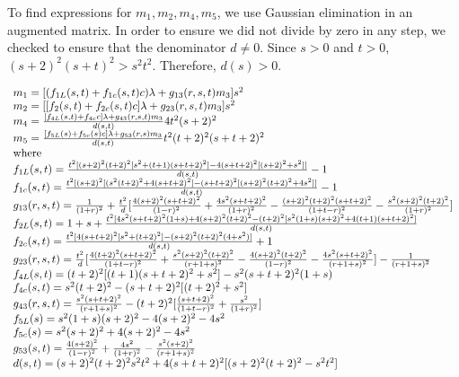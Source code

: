 \documentclass[11pt,leqno]{article}
\theoremstyle{definition}
\theoremstyle{remark}
\numberwithin{equation}{section}
\begin{document}
To find expressions for $m_1,m_2,m_4,m_5$, we use Gaussian elimination in an augmented matrix. In order to ensure we did not divide by zero in any step, we checked to ensure that the denominator $d\neq0$. Since $s>0$ and $t>0$, $(s+2)^2(s+t)^2>s^2t^2$. Therefore, $d(s)>0$.

\begin{equation}\begin{array}{l}
m_{1}=[(f_{1L}(s,t)+f_{1c}(s,t)c)\lambda+g_{13}(r,s,t)m_{3}]s^{2} \\
m_{2}=[[f_{2}(s,t)+f_{2c}(s,t)c]\lambda+g_{23}(r,s,t)m_{3}]s^{2}  \\
m_{4}=\frac{[f_{4L}(s,t)+f_{4c}c]\lambda+g_{43}(r,s,t)m_{3}}{d(s,t)}4t^{2}(s+2)^{2} \\
m_{5}=\frac{[f_{5L}(s)+f_{5c}(s)c]\lambda+g_{53}(r,s)m_{3}}{d(s,t)}t^{2}(t+2)^{2}(s+t+2)^{2} \\
$where$\\
f_{1L}(s,t)=\frac{t^{2}[(s+2)^{2}(t+2)^{2}[s^{2}+(t+1)(s+t+2)^{2}]-4(s+t+2)^{2}[(s+2)^{2}+s^{2}]]}{d(s,t)}-1\\
f_{1c}(s,t)=\frac{t^{2}[(s+2)^{2}[(s^{2}(t+2)^{2}+4(s+t+2)^{2}]-(s+t+2)^{2}[(s+2)^{2}(t+2)^{2}+4s^{2}]]}{d(s,t)}-1\\
g_{13}(r,s,t)=\frac{1}{(1+r)^{2}}+\frac{t^{2}}{d}[\frac{4(s+2)^{2}(s+t+2)^{2}}{(1-r)^{2}}+\frac{4s^{2}(s+t+2)^{2}}{(1+r)^{2}}
-\frac{(s+2)^{2}(t+2)^{2}(s+t+2)^{2}}{(1+t-r)^{2}}-\frac{s^{2}(s+2)^{2}(t+2)^{2}}{(1+r)^{2}}]\\
f_{2L}(s,t)=1+s+\frac{t^{2}[4s^{2}(s+t+2)^{2}(1+s)+4(s+2)^{2}(t+2)^{2}-(t+2)^{2}[s^{2}(1+s)(s+2)^{2}+4(t+1)(s+t+2)^{2}]}{d(s,t)}\\
f_{2c}(s,t)=\frac{t^{2}[4(s+t+2)^{2}[s^{2}+(t+2)^{2}]-(s+2)^{2}(t+2)^{2}(4+s^{2})]}{d(s,t)}+1\\
g_{23}(r,s,t)=\frac{t^{2}}{d}[\frac{4(t+2)^{2}(s+t+2)^{2}}{(1+t-r)^{2}}+\frac{s^{2}(s+2)^{2}(t+2)^{2}}{(r+1+s)^{2}}
-\frac{4(s+2)^{2}(t+2)^{2}}{(1-r)^{2}}-\frac{4s^{2}(s+t+2)^{2}}{(r+1+s)^{2}}]-\frac{1}{(r+1+s)^{2}}\\
f_{4L}(s,t)=(t+2)^{2}[(t+1)(s+t+2)^{2}+s^{2}]-s^{2}(s+t+2)^{2}(1+s)\\
f_{4c}(s,t)=s^{2}(t+2)^{2}-(s+t+2)^{2}[(t+2)^{2}+s^{2}]\\
g_{43}(r,s,t)=\frac{s^{2}(s+t+2)^{2}}{(r+1+s)^{2}}-(t+2)^{2}[\frac{(s+t+2)^{2}}{(1+t-r)^{2}}+\frac{s^{2}}{(1+r)^{2}}]\\
f_{5L}(s)=s^{2}(1+s)(s+2)^{2}-4(s+2)^{2}-4s^{2}\\
f_{5c}(s)=s^{2}(s+2)^{2}+4(s+2)^{2}-4s^{2}\\
g_{53}(s,t)=\frac{4(s+2)^{2}}{(1-r)^{2}}+\frac{4s^{2}}{(1+r)^{2}}-\frac{s^{2}(s+2)^{2}}{(r+1+s)^{2}}\\
d(s,t)=(s+2)^{2}(t+2)^{2}s^{2}t^{2}+4(s+t+2)^{2}[(s+2)^{2}(t+2)^{2}-s^{2}t^{2}]
\end{array}
\end{equation}
\end{document}
